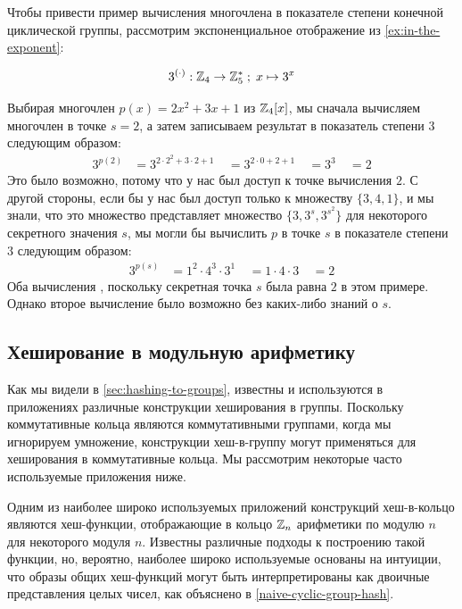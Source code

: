 \begin{example} Чтобы привести пример вычисления многочлена в показателе степени конечной циклической группы, рассмотрим экспоненциальное отображение из \examplename{} \ref{ex:in-the-exponent}:

\begin{equation}
3^{(\cdot)}: \mathbb{Z}_4 \to \mathbb{Z}_5^* \;;\; x \mapsto 3^x
\end{equation}

Выбирая многочлен $p(x)= 2x^2 +3x +1$ из $\mathbb{Z}_4[x]$, мы сначала вычисляем многочлен в точке $s=2$, а затем записываем результат в показатель степени $3$ следующим образом:
\begin{align*}
3^{p(2)} &=3^{2\cdot 2^2+3\cdot 2 +1}\
          & = 3^{2\cdot 0 +2 +1}\
          & = 3^{3}\
          & = 2
\end{align*}
Это было возможно, потому что у нас был доступ к точке вычисления $2$. С другой стороны, если бы у нас был доступ только к множеству $\{3, 4, 1\}$, и мы знали, что это множество представляет множество $\{3,3^s, 3^{s^2}\}$ для некоторого секретного значения $s$, мы могли бы вычислить
$p$ в точке $s$ в показателе степени $3$ следующим образом:
\begin{align*}
3^{p(s)} &= 1^2 \cdot 4^3\cdot 3^1\
         &= 1\cdot 4\cdot 3\
         &= 2
\end{align*}
Оба вычисления , поскольку секретная точка $s$ была равна $2$ в этом примере. Однако второе вычисление было возможно без каких-либо знаний о $s$.
\end{example}

\subsection{Хеширование в модульную арифметику}
\label{hash-to-modular-arithmetics}
Как мы видели в \secname{} \ref{sec:hashing-to-groups}, известны и используются в приложениях различные конструкции хеширования в группы. Поскольку коммутативные кольца являются коммутативными группами, когда мы игнорируем умножение, конструкции хеш-в-группу могут применяться для хеширования в коммутативные кольца. Мы рассмотрим некоторые часто используемые приложения ниже.


Одним из наиболее широко используемых приложений конструкций хеш-в-кольцо являются хеш-функции, отображающие в кольцо $\mathbb{Z}_n$ арифметики по модулю $n$ для некоторого модуля $n$. Известны различные подходы к построению такой функции, но, вероятно, наиболее широко используемые основаны на интуиции, что образы общих хеш-функций могут быть интерпретированы как двоичные представления целых чисел, как объяснено в \examplename{} \ref{naive-cyclic-group-hash}.

